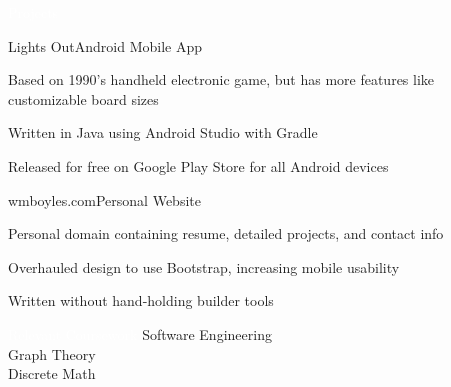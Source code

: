 \documentclass{resume} %
\begin{document}
\begin{rSection}{\colorbox{NCSURED}{\textcolor{WHITE}{Projects}}}
	\begin{rSubsection}{Lights Out}{Android Mobile App}{}{}
		\item Based on 1990's handheld electronic game, but has more features like customizable board sizes
		\item Written in Java using Android Studio with Gradle
		\item Released for free on Google Play Store for all Android devices
	\end{rSubsection}
	
	\begin{rSubsection}{wmboyles.com}{Personal Website}{}{}
		\item Personal domain containing resume, detailed projects, and contact info
		\item Overhauled design to use Bootstrap, increasing mobile usability
		\item Written without hand-holding builder tools
	\end{rSubsection}	
\end{rSection}


\begin{rSection}{\colorbox{NCSURED}{\textcolor{WHITE}{Relevant Coursework}}}
	{Software Engineering}
	 \\
	{Graph Theory}
	 \\
	{Discrete Math}
\end{rSection}
\end{document}
